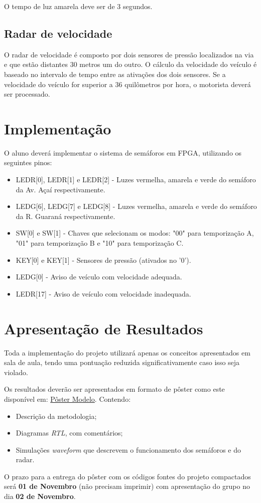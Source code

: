 O tempo de luz amarela deve ser de 3 segundos.

\subsection{Radar de velocidade}

\setlength{\parindent}{2cm}
O radar de velocidade é composto por dois sensores de pressão localizados na via e que estão distantes 30 metros um do outro. O cálculo da velocidade do veículo é baseado no intervalo de tempo entre as ativações dos dois sensores. Se a velocidade do veículo for superior a 36 quilômetros por hora, o motorista deverá ser processado.

\section{Implementação}

O aluno deverá implementar o sistema de semáforos em FPGA, utilizando os seguintes pinos:
\begin{itemize}
    \justifying
    \item LEDR[0], LEDR[1] e LEDR[2] - Luzes vermelha, amarela e verde do semáforo da Av. Açaí respectivamente.
    \item LEDG[6], LEDG[7] e LEDG[8] - Luzes vermelha, amarela e verde do semáforo da R. Guaraná respectivamente.
    \item SW[0] e SW[1] - Chaves que selecionam os modos: "00" para temporização A, "01" para temporização B e "10" para temporização C.
    \item KEY[0] e KEY[1] -  Sensores de pressão (ativados no '0').
    \item LEDG[0] - Aviso de veículo com velocidade adequada.
    \item LEDR[17] - Aviso de veículo com velocidade inadequada.
\end{itemize}

\section{Apresentação de Resultados}
Toda a implementação do projeto utilizará apenas os conceitos apresentados em sala de aula, tendo uma pontuação reduzida significativamente caso isso seja violado.

Os resultados deverão ser apresentados em formato de pôster como este disponível em: \href{www.github.com/~kenreurison/posterModelo}{Pôster Modelo}. Contendo:
\begin{itemize}
    \item Descrição da metodologia;
    \item Diagramas \textit{RTL}, com comentários;
    \item Simulações \textit{waveform} que descrevem o funcionamento dos semáforos e do radar.
\end{itemize}

O prazo para a entrega do pôster com os códigos fontes do projeto compactados será \textbf{01 de Novembro} (não precisam imprimir) com apresentação do grupo no dia \textbf{02 de Novembro}.
